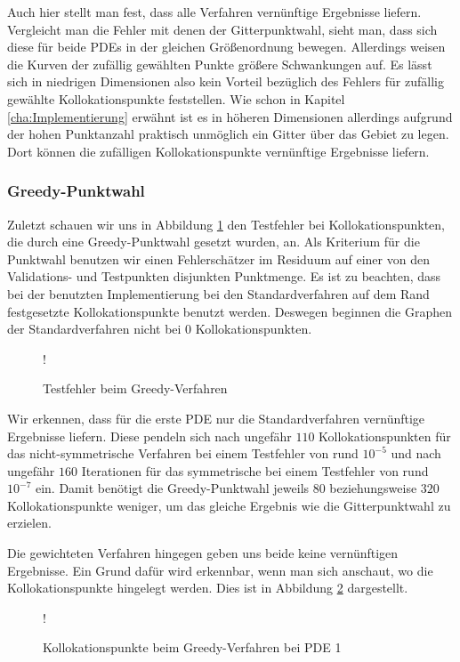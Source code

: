 Auch hier stellt man fest, dass alle Verfahren vernünftige Ergebnisse liefern. Vergleicht man die Fehler mit denen der Gitterpunktwahl, sieht man, dass sich diese für beide \acp{PDE} in der gleichen Größenordnung bewegen. Allerdings weisen die Kurven der zufällig gewählten Punkte größere Schwankungen auf. Es lässt sich in niedrigen Dimensionen also kein Vorteil bezüglich des Fehlers für zufällig gewählte Kollokationspunkte feststellen. Wie schon in Kapitel \ref{cha:Implementierung} erwähnt ist es in höheren Dimensionen allerdings aufgrund der hohen Punktanzahl praktisch unmöglich ein Gitter über das Gebiet zu legen. Dort können die zufälligen Kollokationspunkte vernünftige Ergebnisse liefern.
\pagebreak

\subsubsection{Greedy-Punktwahl}
Zuletzt schauen wir uns in Abbildung \ref{fig:error-greedy} den Testfehler bei Kollokationspunkten, die durch eine Greedy-Punktwahl gesetzt wurden, an. Als Kriterium für die Punktwahl benutzen wir einen Fehlerschätzer im Residuum auf einer von den Validations- und Testpunkten disjunkten Punktmenge. Es ist zu beachten, dass bei der benutzten Implementierung bei den Standardverfahren auf dem Rand festgesetzte Kollokationspunkte benutzt werden. Deswegen beginnen die Graphen der Standardverfahren nicht bei $0$ Kollokationspunkten.
\begin{figure}[ht]
\centering
\resizebox {\columnwidth} {!} {

}
\caption{Testfehler beim Greedy-Verfahren}
\label{fig:error-greedy}
\end{figure}

Wir erkennen, dass für die erste \ac{PDE} nur die Standardverfahren vernünftige Ergebnisse liefern. Diese pendeln sich nach ungefähr $110$ Kollokationspunkten für das nicht-symmetrische Verfahren bei einem Testfehler von rund $10^{-5}$ und nach ungefähr $160$ Iterationen für das symmetrische bei einem Testfehler von rund $10^{-7}$ ein. Damit benötigt die Greedy-Punktwahl jeweils $80$ beziehungsweise $320$ Kollokationspunkte weniger, um das gleiche Ergebnis wie die Gitterpunktwahl zu erzielen.

Die gewichteten Verfahren hingegen geben uns beide keine vernünftigen Ergebnisse. Ein Grund dafür wird erkennbar, wenn man sich anschaut, wo die Kollokationspunkte hingelegt werden. Dies ist in Abbildung \ref{fig:greedy-points} dargestellt.
\begin{figure}[ht]
\centering
\resizebox {\columnwidth} {!} {

}
\caption{Kollokationspunkte beim Greedy-Verfahren bei \acs{PDE} 1}
\label{fig:greedy-points}
\end{figure}

